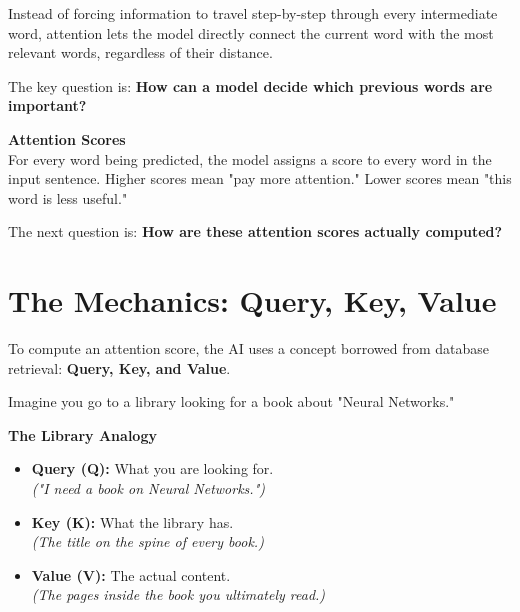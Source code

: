 \documentclass[11pt]{article}
\begin{document}
\vspace{0.05in}

Instead of forcing information to travel step-by-step through every intermediate word, attention lets the model directly connect the current word with the most relevant words, regardless of their distance.

\vspace{0.05in}

The key question is: \textbf{How can a model decide which previous words are important?}

\vspace{0.02in}

\begin{infobox}
{\large\color{brandblue}\textbf{Attention Scores}}\\[0.05in]
For every word being predicted, the model assigns a score to every word in the input sentence. Higher scores mean "pay more attention." Lower scores mean "this word is less useful."
\end{infobox}

\vspace{0.05in}

\begin{center}
The next question is: \textbf{How are these attention scores actually computed?}
\end{center}

\newpage

\section*{The Mechanics: Query, Key, Value}

\vspace{0.15in}

To compute an attention score, the AI uses a concept borrowed from database retrieval: \textbf{Query, Key, and Value}.

Imagine you go to a library looking for a book about "Neural Networks."

\vspace{0.15in}

\begin{darkbox}
{\large\textbf{The Library Analogy}}

\begin{itemize}[leftmargin=*, itemsep=0.1in]
    \item \textbf{Query (Q):} What you are looking for.\\ \textit{("I need a book on Neural Networks.")}
    \item \textbf{Key (K):} What the library has.\\ \textit{(The title on the spine of every book.)}
    \item \textbf{Value (V):} The actual content.\\ \textit{(The pages inside the book you ultimately read.)}
\end{itemize}
\end{darkbox}
\end{document}
